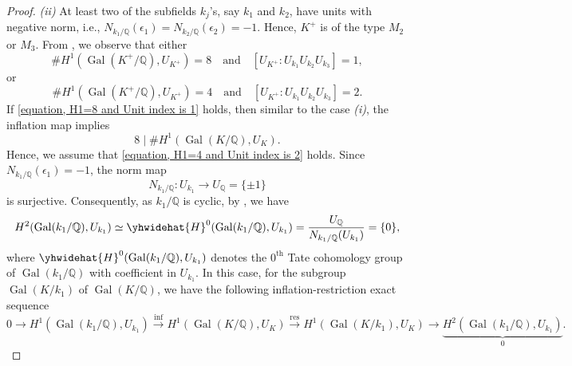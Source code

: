 \documentclass[12pt]{amsart}
\theoremstyle{definition}
\numberwithin{equation}{section}
\DeclareMathOperator{\Gal}{Gal}
\begin{document}
\begin{proof}
\smallskip	
\textit{(ii)}
At least two of the subfields $k_j$'s, say $k_1$ and $k_2$, have units with negative norm, i.e., $N_{k_1/\mathbb{Q}}(\epsilon_1)=N_{k_2/\mathbb{Q}}(\epsilon_2)=-1$. Hence,  $K^+$ is of the type $M_2$ or $M_3$. From \cite[Table I]{Bennett}, we observe that either
	\begin{equation} \label{equation, H1=8 and Unit index is 1}
		\# H^1(\Gal(K^+/\mathbb{Q}),U_{K^+})=8 \quad \text{and} \quad \left[U_{K^+}:U_{k_1}U_{k_2}U_{k_3}\right]=1,
	\end{equation}
	or
	\begin{equation} \label{equation, H1=4 and Unit index is 2}
		\# H^1(\Gal(K^+/\mathbb{Q}),U_{K^+})=4 \quad \text{and} \quad \left[U_{K^+}:U_{k_1}U_{k_2}U_{k_3}\right]=2.
	\end{equation}
	If \eqref{equation, H1=8 and Unit index is 1} holds, then similar to the case \textit{(i)}, the inflation map implies
	\begin{equation*}
		8 \mid \# H^1(\Gal(K/\mathbb{Q}),U_{K}).
	\end{equation*}
	Hence, we assume that \eqref{equation, H1=4 and Unit index is 2} holds. Since  $N_{k_1/\mathbb{Q}}(\epsilon_1)=-1$,  the norm map 
	\begin{equation*}
		N_{k_1/\mathbb{Q}}:U_{k_1} \rightarrow U_{\mathbb{Q}}=\{\pm 1\}
	\end{equation*}
is surjective. Consequently, as $k_1/\mathbb{Q}$ is cyclic, by \cite[Proposition 1.6.12]{Neukirch}, we have
	\begin{equation}\label{trivial}
		H^2(\Gal(k_1/\mathbb{Q}),U_{k_1}) \simeq \yhwidehat{H}^0(\Gal(k_1/\mathbb{Q}),U_{k_1})=\frac{U_{\mathbb{Q}}}{N_{k_1/\mathbb{Q}}(U_{k_1})}=\{0\},
	\end{equation}
	where 
		$\yhwidehat{H}^{0}(\Gal(k_1/\mathbb{Q}),U_{k_1})$ denotes the $0^{\text{th}}$ Tate cohomology group of $\Gal(k_1/\mathbb{Q})$ with coefficient in $U_{k_1}$. In this case,
	for the subgroup $\Gal(K/k_1)$ of $\Gal(K/\mathbb{Q})$, we have the following {inflation-restriction} exact sequence 
	\begin{equation} \label{equation, Inf-Res for K/k1}
		0 \rightarrow H^1(\Gal(k_1/\mathbb{Q}),U_{k_1}) \xrightarrow{\text{inf}} H^1(\Gal(K/\mathbb{Q}),U_K) \xrightarrow{\text{res}} H^1(\Gal(K/k_1),U_K) \rightarrow 	\underbrace{H^2(\Gal(k_1/\mathbb{Q}),U_{k_1})}_{0}.
	\end{equation} 
	

\end{proof}
\end{document}
